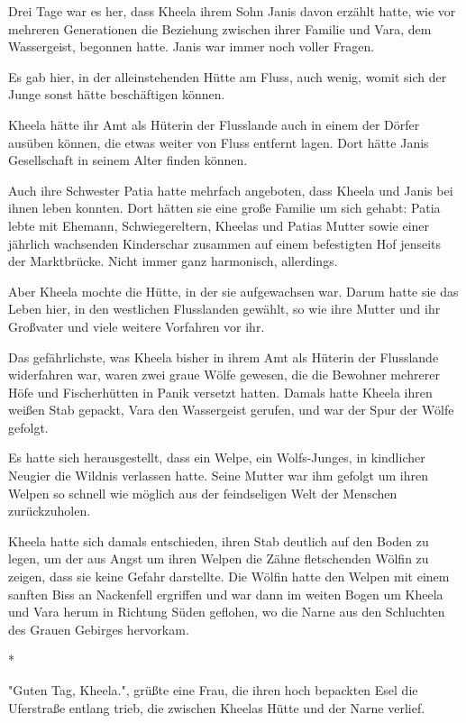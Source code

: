 \documentclass[10pt, a4paper, oneside]{book}
\begin{document}
\begin{multicols}{2}
Drei Tage war es her, dass Kheela ihrem Sohn Janis davon erzählt hatte, wie vor mehreren Generationen die Beziehung zwischen ihrer Familie und Vara, dem Wassergeist, begonnen hatte. Janis war immer noch voller Fragen. 

Es gab hier, in der alleinstehenden Hütte am Fluss, auch wenig, womit sich der Junge sonst hätte beschäftigen können. 

Kheela hätte ihr Amt als Hüterin der Flusslande auch in einem der Dörfer ausüben können, die etwas weiter von Fluss entfernt lagen. Dort hätte Janis Gesellschaft in seinem Alter finden können. 

Auch ihre Schwester Patia hatte mehrfach angeboten, dass Kheela und Janis bei ihnen leben konnten. Dort hätten sie eine große Familie um sich gehabt: Patia lebte mit Ehemann, Schwiegereltern, Kheelas und Patias Mutter sowie einer jährlich wachsenden Kinderschar zusammen auf einem befestigten Hof jenseits der Marktbrücke. Nicht immer ganz harmonisch, allerdings. 

Aber Kheela mochte die Hütte, in der sie aufgewachsen war. Darum hatte sie das Leben hier, in den westlichen Flusslanden gewählt, so wie ihre Mutter und ihr Großvater und viele weitere Vorfahren vor ihr. 

Das gefährlichste, was Kheela bisher in ihrem Amt als Hüterin der Flusslande widerfahren war, waren zwei graue Wölfe gewesen, die die Bewohner mehrerer Höfe und Fischerhütten in Panik versetzt hatten. Damals hatte Kheela ihren weißen Stab gepackt, Vara den Wassergeist gerufen, und war der Spur der Wölfe gefolgt. 

Es hatte sich herausgestellt, dass ein Welpe, ein Wolfs-Junges, in kindlicher Neugier die Wildnis verlassen hatte. Seine Mutter war ihm gefolgt um ihren Welpen so schnell wie möglich aus der feindseligen Welt der Menschen zurückzuholen. 

Kheela hatte sich damals entschieden, ihren Stab deutlich auf den Boden zu legen, um der aus Angst um ihren Welpen die Zähne fletschenden Wölfin zu zeigen, dass sie keine Gefahr darstellte. Die Wölfin hatte den Welpen mit einem sanften Biss an Nackenfell ergriffen und war dann im weiten Bogen um Kheela und Vara herum in Richtung Süden geflohen, wo die Narne aus den Schluchten des Grauen Gebirges hervorkam. 

\begin{center}
    * 
\end{center}

"Guten Tag, Kheela.", grüßte eine Frau, die ihren hoch bepackten Esel die 
Uferstraße entlang trieb, die zwischen Kheelas Hütte und der Narne verlief.


\end{multicols}
\end{document}
